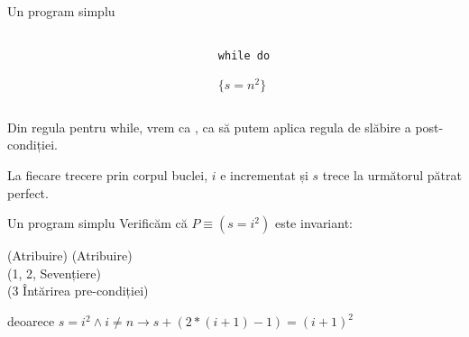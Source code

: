 \begin{frame}{Un program simplu}
\begin{example}[cont.]

\medskip
\begin{columns}
\begin{column}{0.4\textwidth}
\end{column}
\begin{column}{0.4\textwidth}
\texttt{while  do}

\hspace{.3cm} 

\hspace{.3cm} 

$\{s = n^2\}$
\end{column}
\end{columns}

\medskip
Din regula pentru while, vrem ca , ca să putem aplica regula de slăbire a post-condiției.

La fiecare trecere prin corpul buclei, $i$ e incrementat și $s$ trece la următorul pătrat perfect.

\pause
{}
\end{example}
\end{frame}


\begin{frame}{Un program simplu}
Verificăm că $P \equiv (s = i^2)$ este invariant: 

\pause
\begin{enumerate}[<+->]
	\vitem {} \hfill (Atribuire)
	\vitem {} \hfill (Atribuire)
	\vitem {} \\ \hfill(1, 2, Sevențiere)
	\vitem {} \\ \hfill(3 Întărirea pre-condiției)

	  deoarece $s = i^2 \wedge i \neq n \to s+(2*(i+1)-1)=(i+1)^2$
\end{enumerate}
\end{frame}

